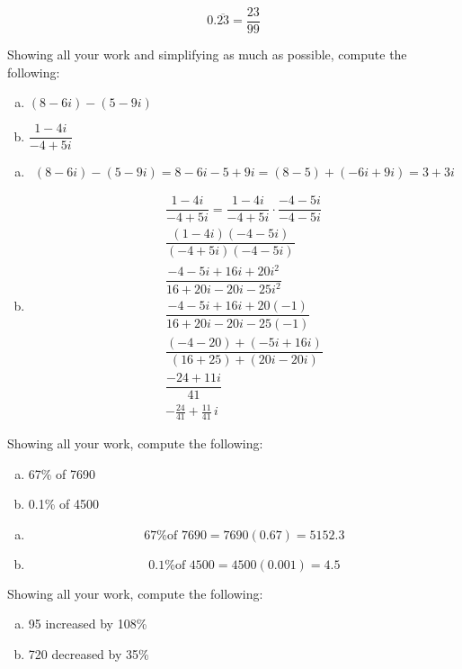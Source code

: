 \documentclass[12pt,letterpaper]{exam}
\begin{document}
\begin{questions}
	\[
	0.\overline{23}= \dfrac{23}{99}
	\] 



\newpage
\question[5] Showing all your work and simplifying as much as possible, compute the following:
	\begin{enumerate}[(a)]
	\item $(8 - 6i) - (5 - 9i)$
	\item $\dfrac{1 - 4i}{-4 + 5i}$
	\end{enumerate} \pspace

\sol 
\begin{enumerate}[(a)]
\item 
	\[
	(8 - 6i) - (5 - 9i)= 8 - 6i - 5 + 9i= (8 - 5) + (-6i + 9i)= 3 + 3i
	\] \pspace

\item 
	\[
	\begin{gathered}
	\dfrac{1 - 4i}{-4 + 5i}= \dfrac{1 - 4i}{-4 + 5i} \cdot \dfrac{-4 - 5i}{-4 - 5i} \\[0.3cm]
	\dfrac{(1 - 4i)(-4 - 5i)}{(-4 + 5i)(-4 - 5i)} \\[0.3cm]
	\dfrac{-4 - 5i + 16i + 20i^2}{16 + 20i - 20i - 25i^2} \\[0.3cm]
	\dfrac{-4 - 5i + 16i + 20(-1)}{16 + 20i - 20i - 25(-1)} \\[0.3cm]
	\dfrac{(-4 - 20) + (-5i + 16i)}{(16 + 25) + (20i - 20i)} \\[0.3cm]
	\dfrac{-24 + 11i}{41} \\[0.3cm]
	-\frac{24}{41} + \frac{11}{41}\,i
	\end{gathered}
	\]
\end{enumerate}



\newpage
\question[5] Showing all your work, compute the following:
	\begin{enumerate}[(a)]
	\item 67\% of 7690
	\item 0.1\% of 4500
	\end{enumerate} \pspace

\sol 
\begin{enumerate}[(a)]
\item 
	\[
	\text{67\% of 7690}= 7690 (0.67)= 5152.3
	\] \pspace

\item 
	\[
	\text{0.1\% of 4500}= 4500 (0.001)= 4.5
	\]
\end{enumerate}



\newpage
\question[5] Showing all your work, compute the following:
	\begin{enumerate}[(a)]
	\item 95 increased by 108\%
	\item 720 decreased by 35\%
	\end{enumerate} \pspace


\end{questions}
\end{document}
